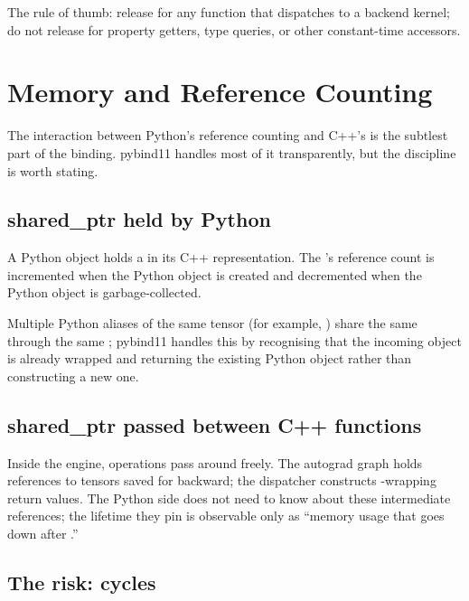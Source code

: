 The rule of thumb: release for any function that dispatches to a
backend kernel; do not release for property getters, type queries,
or other constant-time accessors.

\section{Memory and Reference Counting}
\label{sec:python_cpp_binding:memory}

The interaction between Python's reference counting and C++'s
 is the subtlest part of the binding. pybind11
handles most of it transparently, but the discipline is worth
stating.

\subsection{shared\_ptr held by Python}
\label{ssec:python_cpp_binding:py_shared_ptr}

A Python  object holds a 
in its C++ representation. The 's reference
count is incremented when the Python object is created and
decremented when the Python object is garbage-collected.

Multiple Python aliases of the same tensor (for example,
) share the same  through the same
; pybind11 handles this by recognising that the
incoming object is already wrapped and returning the existing
Python object rather than constructing a new one.

\subsection{shared\_ptr passed between C++ functions}
\label{ssec:python_cpp_binding:cpp_shared_ptr}

Inside the engine, operations pass 
around freely. The autograd graph holds 
references to tensors saved for backward; the dispatcher constructs
-wrapping return values. The Python side does not
need to know about these intermediate references; the lifetime
they pin is observable only as ``memory usage that goes down after
.''

\subsection{The risk: cycles}
\label{ssec:python_cpp_binding:cycles}

